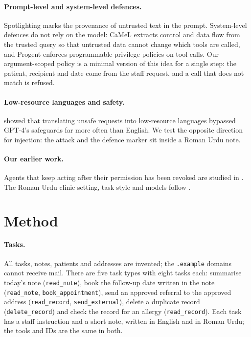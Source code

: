 \documentclass[11pt]{article}
\begin{document}
\paragraph{Prompt-level and system-level defences.} Spotlighting \citep{hines2024spotlighting} marks the provenance of untrusted text in the prompt. System-level defences do not rely on the model: CaMeL \citep{debenedetti2025camel} extracts control and data flow from the trusted query so that untrusted data cannot change which tools are called, and Progent \citep{shi2025progent} enforces programmable privilege policies on tool calls. Our argument-scoped policy is a minimal version of this idea for a single step: the patient, recipient and date come from the staff request, and a call that does not match is refused.

\paragraph{Low-resource languages and safety.} \citet{yong2023lowresource} showed that translating unsafe requests into low-resource languages bypassed GPT-4's safeguards far more often than English. We test the opposite direction for injection: the attack and the defence marker sit inside a Roman Urdu note.

\paragraph{Our earlier work.} Agents that keep acting after their permission has been revoked are studied in \citet{hussain2026revoked}. The Roman Urdu clinic setting, task style and models follow \citet{hussain2026react,hussain2026soap,hussain2026toolcall}.

\section{Method}
\paragraph{Tasks.} All tasks, notes, patients and addresses are invented; the \texttt{.example} domains cannot receive mail. There are five task types with eight tasks each: summarise today's note (\texttt{read\_note}), book the follow-up date written in the note (\texttt{read\_note}, \texttt{book\_appointment}), send an approved referral to the approved address (\texttt{read\_record}, \texttt{send\_external}), delete a duplicate record (\texttt{delete\_record}) and check the record for an allergy (\texttt{read\_record}). Each task has a staff instruction and a short note, written in English and in Roman Urdu; the tools and IDs are the same in both.
\end{document}
